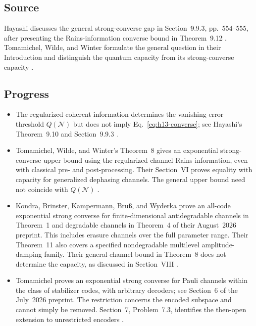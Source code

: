 \subsection*{Source}

Hayashi discusses the general strong-converse gap in Section~9.9.3, pp.~554--555, after presenting the Rains-information converse bound in Theorem~9.12 . Tomamichel, Wilde, and Winter formulate the general question in their Introduction and distinguish the quantum capacity from its strong-converse capacity .

\subsection*{Progress}

\begin{itemize}
  \item The regularized coherent information determines the vanishing-error threshold $Q(\mathcal N)$ but does not imply Eq.~\eqref{eq:h13-converse}; see Hayashi's Theorem~9.10 and Section~9.9.3 .

  \item Tomamichel, Wilde, and Winter's Theorem~8 gives an exponential strong-converse upper bound using the regularized channel Rains information, even with classical pre- and post-processing. Their Section~VI proves equality with capacity for generalized dephasing channels. The general upper bound need not coincide with $Q(\mathcal N)$ .

  \item Kondra, Brinster, Kampermann, Bru{\ss}, and Wyderka prove an all-code exponential strong converse for finite-dimensional antidegradable channels in Theorem~1 and degradable channels in Theorem~4 of their August~2026 preprint. This includes erasure channels over the full parameter range. Their Theorem~11 also covers a specified nondegradable multilevel amplitude-damping family. Their general-channel bound in Theorem~8 does not determine the capacity, as discussed in Section~VIII .

  \item Tomamichel proves an exponential strong converse for Pauli channels within the class of stabilizer codes, with arbitrary decoders; see Section~6 of the July~2026 preprint. The restriction concerns the encoded subspace and cannot simply be removed. Section~7, Problem~7.3, identifies the then-open extension to unrestricted encoders .


\end{itemize}
